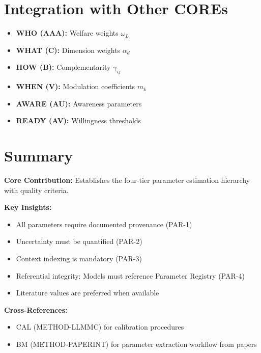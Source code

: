 \section{Integration with Other COREs}

\begin{tcolorbox}[colback=yellow!5!white, colframe=yellow!75!black,
    title=Integration: WHERE provides parameters to all COREs]
\begin{itemize}[nosep]
\item \textbf{WHO (AAA):} Welfare weights $\omega_L$
\item \textbf{WHAT (C):} Dimension weights $\alpha_d$
\item \textbf{HOW (B):} Complementarity $\gamma_{ij}$
\item \textbf{WHEN (V):} Modulation coefficients $m_k$
\item \textbf{AWARE (AU):} Awareness parameters
\item \textbf{READY (AV):} Willingness thresholds
\end{itemize}
\end{tcolorbox}

\section{Summary}

\begin{tcolorbox}[colback=gray!5!white, colframe=gray!75!black,
    title=Appendix BBB Summary: CORE-WHERE]

\textbf{Core Contribution:}
Establishes the four-tier parameter estimation hierarchy with quality criteria.

\textbf{Key Insights:}
\begin{itemize}[nosep]
\item All parameters require documented provenance (PAR-1)
\item Uncertainty must be quantified (PAR-2)
\item Context indexing is mandatory (PAR-3)
\item Referential integrity: Models must reference Parameter Registry (PAR-4)
\item Literature values are preferred when available
\end{itemize}

\textbf{Cross-References:}
\begin{itemize}[nosep]
\item CAL (METHOD-LLMMC) for calibration procedures
\item BM (METHOD-PAPERINT) for parameter extraction workflow from papers
\end{itemize}

\end{tcolorbox}

